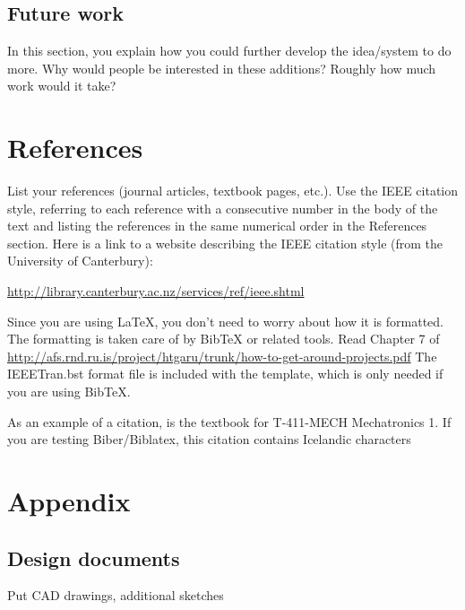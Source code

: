 \documentclass[12pt, svn, draft]{rureport}
\begin{document}
\subsection{Future work}
In this section, you explain how you could further develop the
idea/system to do more.  Why would people be interested in these
additions?  Roughly how much work would it take?

\section{References}
List your references (journal articles, textbook pages, etc.). Use the
IEEE citation style, referring to each reference with a consecutive
number in the body of the text and listing the references in the same
numerical order in the References section. Here is a link to a website
describing the IEEE citation style (from the University of
Canterbury):

\url{http://library.canterbury.ac.nz/services/ref/ieee.shtml}

Since you are using \LaTeX{}, you don't need to worry about how it is formatted.
The formatting is taken care of by BibTeX or related tools.  Read Chapter 7 of 
\url{http://afs.rnd.ru.is/project/htgaru/trunk/how-to-get-around-projects.pdf}
The IEEETran.bst format file is included with the template, which is only needed if you are using BibTeX.

As an example of a citation, \cite{carryer2011IntroMechatronics} is
the textbook for T-411-MECH Mechatronics 1.
If you are testing Biber/Biblatex, this citation contains Icelandic characters \cite{foley2013dustcloud}

\section{Appendix}
\subsection{Design documents}
Put CAD drawings, additional sketches

\printbibliography
\end{document}
